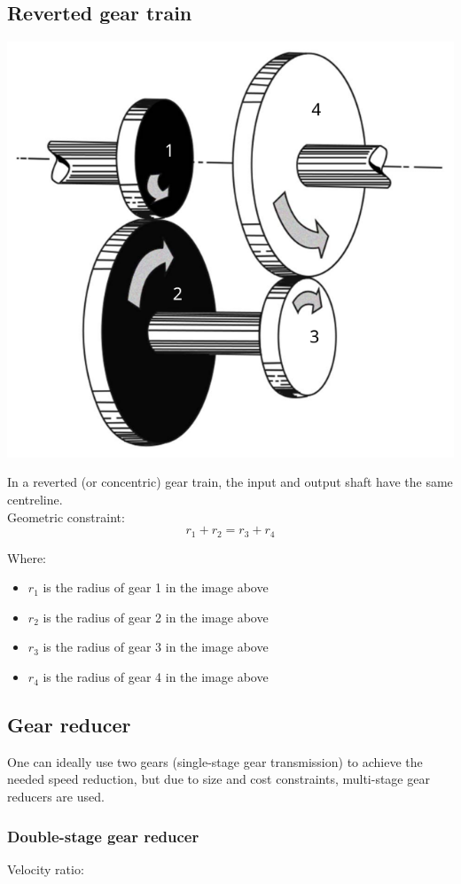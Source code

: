 \documentclass[11pt]{article}
\begin{document}
\subsection{Reverted gear train}
\label{sec:orgd063699}
\begin{center}
\includegraphics[width=.9\linewidth]{./images/reverted-gear-train-image.png}
\end{center}
In a reverted (or concentric) gear train, the input and output shaft have the same centreline.  \\

Geometric constraint:
\[r_1 + r_2 = r_3 + r_4\]

Where:
\begin{itemize}
\item \(r_1\) is the radius of gear 1 in the image above
\item \(r_2\) is the radius of gear 2 in the image above
\item \(r_3\) is the radius of gear 3 in the image above
\item \(r_4\) is the radius of gear 4 in the image above
\end{itemize}
\subsection{Gear reducer}
\label{sec:org7047e10}
One can ideally use two gears (single-stage gear transmission) to achieve the needed speed reduction, but due to size and cost constraints, multi-stage gear reducers are used.
\subsubsection{Double-stage gear reducer}
\label{sec:org443917d}
Velocity ratio:
\end{document}
